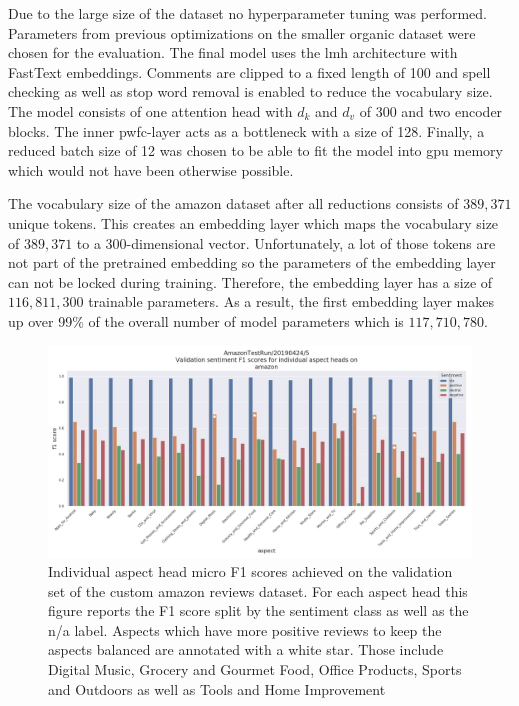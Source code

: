 Due to the large size of the dataset no hyperparameter tuning was performed. Parameters from previous optimizations on the smaller organic dataset were chosen for the evaluation. The final model uses the \gls{lmh} architecture with FastText embeddings. Comments are clipped to a fixed length of 100 and spell checking as well as stop word removal is enabled to reduce the vocabulary size. The model consists of one attention head with $d_k$ and $d_v$ of 300 and two encoder blocks. The inner \gls{pwfc}-layer acts as a bottleneck with a size of 128. Finally, a reduced batch size of 12 was chosen to be able to fit the model into \gls{gpu} memory which would not have been otherwise possible.
\medskip

The vocabulary size of the amazon dataset after all reductions consists of $389,371$ unique tokens. This creates an embedding layer which maps the vocabulary size of $389,371$ to a 300-dimensional vector. Unfortunately, a lot of those tokens are not part of the pretrained embedding so the parameters of the embedding layer can not be locked during training. Therefore, the embedding layer has a size of $116,811,300$ trainable parameters. As a result, the first embedding layer makes up over 99\% of the overall number of model parameters which is $117,710,780$.
\medskip

\begin{figure}[htb]
	\centering
	\includegraphics[width=\textwidth]{figures/06_results/06_am_final_val_f1Sent}
	\caption{Individual aspect head micro F1 scores achieved on the validation set of the custom amazon reviews dataset. For each aspect head this figure reports the F1 score split by the sentiment class as well as the n/a label. Aspects which have more positive reviews to keep the aspects balanced are annotated with a white star. Those include Digital Music, Grocery and Gourmet Food, Office Products, Sports and Outdoors as well as Tools and Home Improvement}
	\label{fig:06_am_val_f1sent}
\end{figure}

